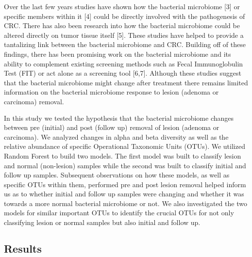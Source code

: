 \documentclass[12pt,]{article}
\begin{document}
Over the last few years studies have shown how the bacterial microbiome
{[}3{]} or specific members within it {[}4{]} could be directly involved
with the pathogenesis of CRC. There has also been research into how the
bacterial microbiome could be altered directly on tumor tissue itself
{[}5{]}. These studies have helped to provide a tantalizing link between
the bacterial microbiome and CRC. Building off of these findings, there
has been promising work on the bacterial microbiome and its ability to
complement existing screening methods such as Fecal Immunoglobulin Test
(FIT) or act alone as a screening tool {[}6,7{]}. Although these studies
suggest that the bacterial microbiome might change after treatment there
remains limited information on the bacterial microbiome response to
lesion (adenoma or carcinoma) removal.

In this study we tested the hypothesis that the bacterial microbiome
changes between pre (initial) and post (follow up) removal of lesion
(adenoma or carcinoma). We analyzed changes in alpha and beta diversity
as well as the relative abundance of specific Operational Taxonomic
Units (OTUs). We utilized Random Forest to build two models. The first
model was built to classify lesion and normal (non-lesion) samples while
the second was built to classify initial and follow up samples.
Subsequent observations on how these models, as well as specific OTUs
within them, performed pre and post lesion removal helped inform us as
to whether initial and follow up samples were changing and whether it
was towards a more normal bacterial microbiome or not. We also
investigated the two models for similar important OTUs to identify the
crucial OTUs for not only classifying lesion or normal samples but also
initial and follow up.

\newpage

\subsection{Results}\label{results}
\end{document}
